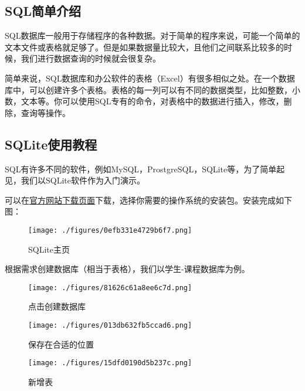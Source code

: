 
\subsection{SQL简单介绍}
SQL数据库一般用于存储程序的各种数据。对于简单的程序来说，可能一个简单的文本文件或表格就足够了。但是如果数据量比较大，且他们之间联系比较多的时候，我们进行数据查询的时候就会很复杂。

简单来说，SQL数据库和办公软件的表格（Excel）有很多相似之处。在一个数据库中，可以创建许多个表格。表格的每一列可以有不同的数据类型，比如整数，小数，文本等。你可以使用SQL专有的命令，对表格中的数据进行插入，修改，删除，查询等操作。

\subsection{SQLite使用教程}
SQL有许多不同的软件，例如MySQL，ProstgreSQL，SQLite等，为了简单起见，我们以SQLite软件作为入门演示。

可以在\href{https://sqlitebrowser.org/dl/}{官方网站下载页面}下载，选择你需要的操作系统的安装包。安装完成如下图：

\begin{figure}[ht]
\centering
\texttt{[image: ./figures/0efb331e4729b6f7.png]}
\caption{SQLite主页} \label{fig_SQLint_1}
\end{figure}

根据需求创建数据库（相当于表格），我们以学生-课程数据库为例。

\begin{figure}[ht]
\centering
\texttt{[image: ./figures/81626c61a8ee6c7d.png]}
\caption{点击创建数据库} \label{fig_SQLint_2}
\end{figure}

\begin{figure}[ht]
\centering
\texttt{[image: ./figures/013db632fb5ccad6.png]}
\caption{保存在合适的位置} \label{fig_SQLint_3}
\end{figure}


\begin{figure}[ht]
\centering
\texttt{[image: ./figures/15dfd0190d5b237c.png]}
\caption{新增表} \label{fig_SQLint_5}
\end{figure}

